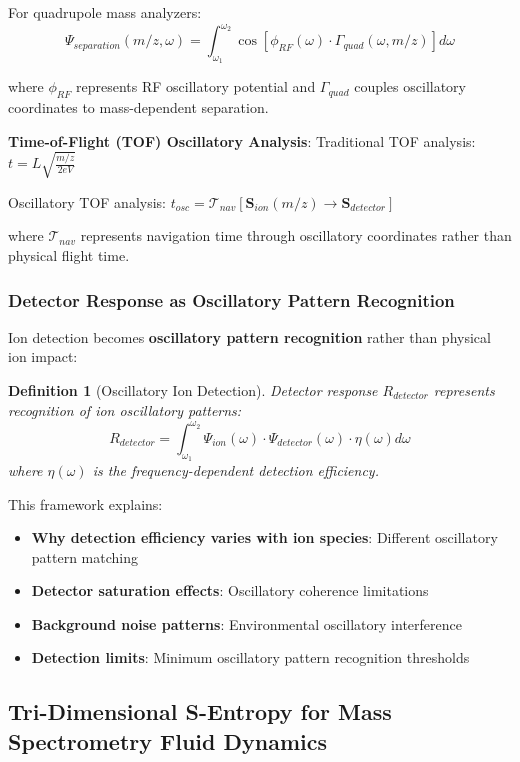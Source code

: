 \documentclass[11pt,a4paper]{article}
\newtheorem{definition}[theorem]{Definition}
\theoremstyle{remark}
\begin{document}
For quadrupole mass analyzers:
$$\Psi_{separation}(m/z, \omega) = \int_{\omega_1}^{\omega_2} \cos[\phi_{RF}(\omega) \cdot \Gamma_{quad}(\omega, m/z)] d\omega$$

where $\phi_{RF}$ represents RF oscillatory potential and $\Gamma_{quad}$ couples oscillatory coordinates to mass-dependent separation.

\textbf{Time-of-Flight (TOF) Oscillatory Analysis}:
Traditional TOF analysis: $t = L\sqrt{\frac{m/z}{2eV}}$

Oscillatory TOF analysis: $t_{osc} = \mathcal{T}_{nav}[\mathbf{S}_{ion}(m/z) \rightarrow \mathbf{S}_{detector}]$

where $\mathcal{T}_{nav}$ represents navigation time through oscillatory coordinates rather than physical flight time.

\subsubsection{Detector Response as Oscillatory Pattern Recognition}

Ion detection becomes \textbf{oscillatory pattern recognition} rather than physical ion impact:

\begin{definition}[Oscillatory Ion Detection]
Detector response $R_{detector}$ represents recognition of ion oscillatory patterns:
$$R_{detector} = \int_{\omega_1}^{\omega_2} \Psi_{ion}(\omega) \cdot \Psi_{detector}(\omega) \cdot \eta(\omega) d\omega$$
where $\eta(\omega)$ is the frequency-dependent detection efficiency.
\end{definition}

This framework explains:
\begin{itemize}
\item \textbf{Why detection efficiency varies with ion species}: Different oscillatory pattern matching
\item \textbf{Detector saturation effects}: Oscillatory coherence limitations  
\item \textbf{Background noise patterns}: Environmental oscillatory interference
\item \textbf{Detection limits}: Minimum oscillatory pattern recognition thresholds
\end{itemize}

\subsection{Tri-Dimensional S-Entropy for Mass Spectrometry Fluid Dynamics}
\end{document}
